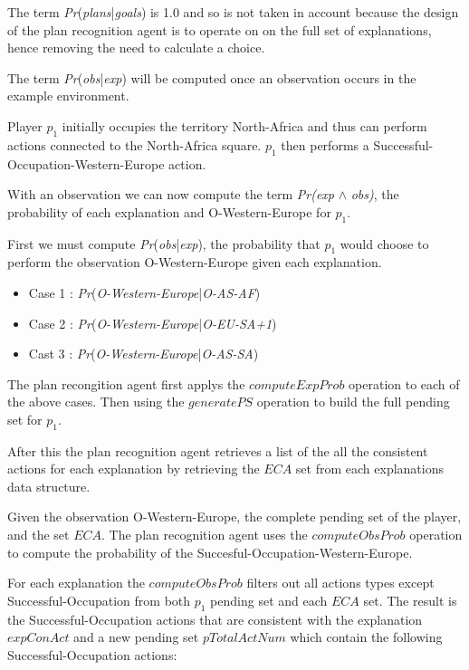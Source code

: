 \documentclass[parskip]{cs4rep}
\begin{document}
The term \textit{Pr}(\textit{plans}|\textit{goals}) is 1.0 and so is not taken in account because the design of the plan recognition agent is to operate on on the full set of explanations, hence removing the need to calculate a choice.

The term \textit{Pr}(\textit{obs}|\textit{exp}) will be computed once an observation occurs in the example environment.

Player $p_1$ initially occupies the territory North-Africa and thus can perform actions connected to the North-Africa square. $p_1$ then performs a Successful-Occupation-Western-Europe action.

With an observation we can now compute the term \textit{Pr(exp} $\wedge$ \textit{obs)}, the probability of each explanation and O-Western-Europe for $p_1$.

First we must compute \textit{Pr}(\textit{obs}|\textit{exp}), the probability that $p_1$ would choose to perform the observation O-Western-Europe given each explanation.

\begin{itemize}
\item
Case 1 : \textit{Pr}(\textit{O-Western-Europe}|\textit{O-AS-AF})
\item
Case 2 : \textit{Pr}(\textit{O-Western-Europe}|\textit{O-EU-SA+1})
\item
Cast 3 : \textit{Pr}(\textit{O-Western-Europe}|\textit{O-AS-SA})
\end{itemize}

The plan recongition agent first applys the $computeExpProb$ operation to each of the above cases. Then using the $generatePS$ operation to build the full pending set for $p_1$.

After this the plan recognition agent retrieves a list of the all the consistent actions for each explanation by retrieving the $ECA$ set from each explanations data structure.

Given the observation O-Western-Europe, the complete pending set of the player, and the set $ECA$. The plan recognition agent uses the $computeObsProb$ operation to compute the probability of the Succesful-Occupation-Western-Europe.

For each explanation the $computeObsProb$ filters out all actions types except Successful-Occupation from both $p_1$ pending set and each $ECA$ set. The result is the Successful-Occupation actions that are consistent with the explanation $expConAct$ and a new pending set $pTotalActNum$ which contain the following Successful-Occupation actions:\newline
\end{document}

